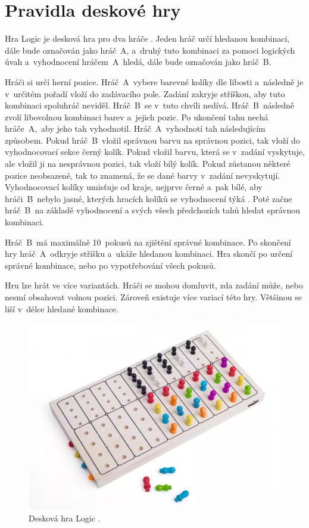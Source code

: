 \chapter{Pravidla deskové hry}
Hra Logic je desková hra pro dva hráče \cite{Logic_pravidla}. Jeden hráč určí hledanou kombinaci, dále bude označován jako 
hráč~A, a~druhý tuto kombinaci za pomoci logických úvah a~vyhodnocení hráčem~A~hledá, dále bude označován jako hráč~B.

Hráči si určí herní pozice. Hráč~A~vybere barevné kolíky dle libosti a~následně je v~určitém pořadí vloží do zadávacího pole. Zadání zakryje
stříškou, aby tuto
kombinaci spoluhráč neviděl. Hráč~B~se v~tuto chvíli nedívá. Hráč~B~následně zvolí libovolnou kombinaci barev a~jejich pozic. Po 
ukončení tahu nechá
hráče~A,~aby jeho tah vyhodnotil. Hráč~A~vyhodnotí tah následujícím způsobem. Pokud hráč~B~vložil správnou barvu na správnou pozici, tak vloží 
do vyhodnocovací sekce černý kolík. Pokud vložil barvu, která se v~zadání vyskytuje, ale vložil ji na nesprávnou pozici, tak vloží bílý kolík.
Pokud zůstanou některé pozice neobsazené, tak to znamená, že se dané barvy v~zadání nevyskytují. 
Vyhodnocovací kolíky umisťuje od kraje, nejprve černé a~pak bílé, aby hráči~B~nebylo jasné, kterých hracích kolíků se vyhodnocení 
týká \cite{Logic_pravidla}.
Poté začne hráč~B~na základě vyhodnocení a svých všech předchozích tahů hledat správnou kombinaci.

Hráč~B~má maximálně 10~pokusů na zjištění správné kombinace. Po skončení hry hráč~A~odkryje stříšku a~ukáže hledanou kombinaci. Hra skončí po 
určení správné 
kombinace, nebo po vypotřebování všech pokusů.

Hru lze hrát ve více variantách. Hráči se mohou domluvit, zda zadání může, nebo nesmí obsahovat volnou pozici. Zároveň existuje 
více variací této hry. Většinou se liší v~délce hledané kombinace.

\begin{figure}[!h]
  \begin{center}
    \includegraphics[scale=0.6]{obrazky/Logic_deskovka.png}
  \end{center}
  \caption[Desková hra Logic \cite{Logic_deskovka}]{Desková hra Logic \cite{Logic_deskovka}.}
\end{figure}

